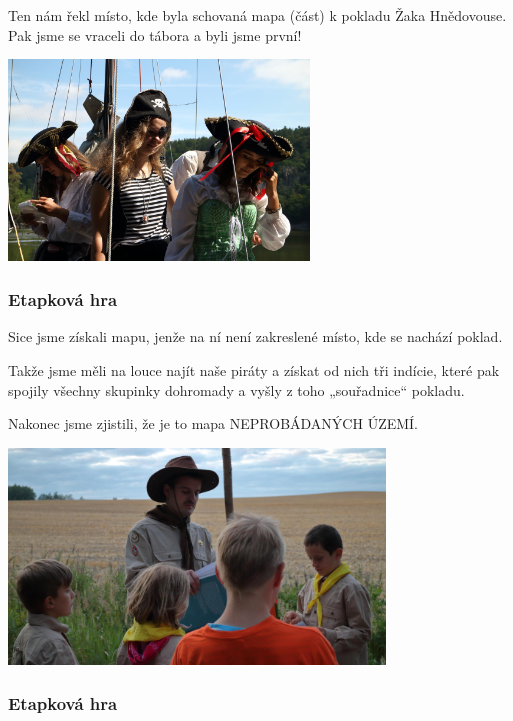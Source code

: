 Ten nám řekl místo, kde byla schovaná mapa (část) k pokladu Žaka Hnědovouse. Pak jsme se vraceli do tábora a byli jsme první!

\begin{center}
	\includegraphics[width=8cm]{img/anpetu_tabor/pirati.JPG}
\end{center}


\subsubsection{Etapková hra} %
\label{ssub:etapková_hra1}

Sice jsme získali mapu, jenže na ní není zakreslené místo, kde se nachází poklad.

Takže jsme měli na louce najít naše piráty a získat od nich tři indície, které pak spojily všechny skupinky dohromady a vyšly z toho „souřadnice“ pokladu.



Nakonec jsme zjistili, že je to mapa NEPROBÁDANÝCH ÚZEMÍ.

\begin{center}
	\includegraphics[width=10cm]{img/anpetu_tabor/svojsik.jpg}
\end{center}


\subsubsection{Etapková hra} %
\label{ssub:etapková_hra2}

